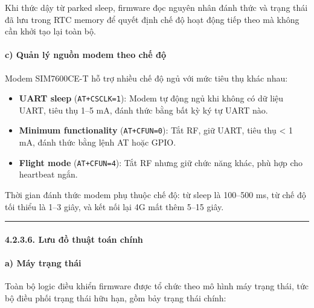 \documentclass[a4paper]{extarticle}
\providecommand{\tightlist}{%
  \setlength{\itemsep}{0pt}\setlength{\parskip}{0pt}}
\begin{document}
Khi thức dậy từ parked sleep, firmware đọc nguyên nhân đánh thức và trạng
thái đã lưu trong RTC memory để quyết định chế độ hoạt động tiếp theo mà
không cần khởi tạo lại toàn bộ.

\paragraph{c) Quản lý nguồn modem theo chế
độ}\label{c-quux1ea3n-luxfd-nguux1ed3n-modem-theo-chux1ebf-ux111ux1ed9}

Modem SIM7600CE-T hỗ trợ nhiều chế độ ngủ với mức tiêu thụ khác nhau:

\begin{itemize}
\tightlist
\item
  \textbf{UART sleep} (\texttt{AT+CSCLK=1}): Modem tự động ngủ khi không
  có dữ liệu UART, tiêu thụ 1--5 mA, đánh thức bằng bất kỳ ký tự UART
  nào.
\item
  \textbf{Minimum functionality} (\texttt{AT+CFUN=0}): Tắt RF, giữ UART,
  tiêu thụ \textless{} 1 mA, đánh thức bằng lệnh AT hoặc GPIO.
\item
  \textbf{Flight mode} (\texttt{AT+CFUN=4}): Tắt RF nhưng giữ chức năng
  khác, phù hợp cho heartbeat ngắn.
\end{itemize}

Thời gian đánh thức modem phụ thuộc chế độ: từ sleep là 100--500 ms, từ
chế độ tối thiểu là 1--3 giây, và kết nối lại 4G mất thêm 5--15
giây.

\begin{center}\rule{0.5\linewidth}{0.5pt}\end{center}

\paragraph{4.2.3.6. Lưu đồ thuật toán
chính}\label{4236-lux1b0u-ux111ux1ed3-thuux1eadt-touxe1n-chuxednh}

\paragraph{a) Máy trạng thái}\label{a-muxe1y-trux1ea1ng-thuxe1i-state-machine}

Toàn bộ logic điều khiển firmware được tổ chức theo mô hình máy trạng
thái, tức bộ điều phối trạng thái hữu hạn, gồm bảy trạng thái chính:
\end{document}
